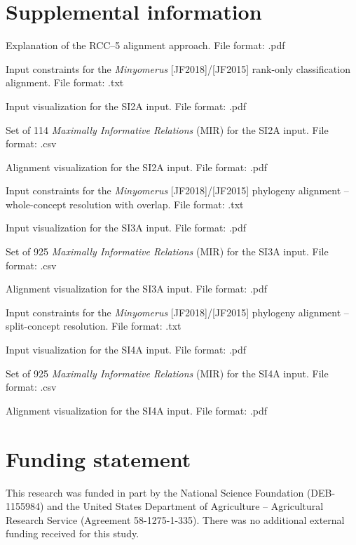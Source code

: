 \documentclass[fleqn,10pt,lineno]{wlpeerj} %
\begin{document}
\section*{Supplemental information}
		\begin{description}[itemsep=-1ex]
			\item[\texttt{SI1}] Explanation of the RCC--5 alignment approach. File format: .pdf
			\item[\texttt{SI2A}] Input constraints for the \textit{Minyomerus} [JF2018]/[JF2015] rank-only classification alignment. File format: .txt
			\item[\texttt{SI2B}] Input visualization for the SI2A input. File format: .pdf
			\item[\texttt{SI2C}] Set of 114 \textit{Maximally Informative Relations} (MIR) for the SI2A input. File format: .csv
			\item[\texttt{SI2D}] Alignment visualization for the SI2A input. File format: .pdf
			\item[\texttt{SI3A}] Input constraints for the \textit{Minyomerus} [JF2018]/[JF2015] phylogeny alignment -- whole-concept resolution with overlap. File format: .txt
			\item[\texttt{SI3B}] Input visualization for the SI3A input. File format: .pdf
			\item[\texttt{SI3C}] Set of 925 \textit{Maximally Informative Relations} (MIR) for the SI3A input. File format: .csv
			\item[\texttt{SI3D}] Alignment visualization for the SI3A input. File format: .pdf
			\item[\texttt{SI4A}] Input constraints for the \textit{Minyomerus} [JF2018]/[JF2015] phylogeny alignment -- split-concept resolution. File format: .txt
			\item[\texttt{SI4B}] Input visualization for the SI4A input. File format: .pdf
			\item[\texttt{SI4C}] Set of 925 \textit{Maximally Informative Relations} (MIR) for the SI4A input. File format: .csv
			\item[\texttt{SI4D}] Alignment visualization for the SI4A input. File format: .pdf
		\end{description}

\section*{Funding statement}
	This research was funded in part by the National Science Foundation (DEB-1155984) and the United States Department of Agriculture -- Agricultural Research Service (Agreement 58-1275-1-335).
	There was no additional external funding received for this study.
\end{document}
